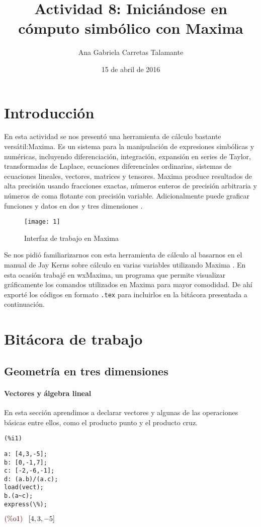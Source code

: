 \documentclass[12pt]{article}
\title{Actividad 8: Iniciándose en cómputo simbólico con Maxima}
\author{Ana Gabriela Carretas Talamante}
\date{15 de abril de 2016}
\begin{document}
\maketitle
\section{Introducción}
En esta actividad se nos presentó una herramienta de cálculo bastante versátil:Maxima. Es un sistema para la manipulación de expresiones simbólicas y numéricas, incluyendo diferenciación, integración, expansión en series de Taylor, transformadas de Laplace, ecuaciones diferenciales ordinarias, sistemas de ecuaciones lineales, vectores, matrices y tensores. Maxima produce resultados de alta precisión usando fracciones exactas, números enteros de precisión arbitraria y números de coma flotante con precisión variable. Adicionalmente puede graficar funciones y datos en dos y tres dimensiones \cite{M}.

\begin{figure}[H]
\centering
\texttt{[image: 1]}
\caption{Interfaz de trabajo en Maxima}
\end{figure}

Se nos pidió familiarizarnos con esta herramienta de cálculo al basarnos en el manual de Jay Kerns sobre cálculo en varias variables utilizando Maxima \cite{JK}. En esta ocasión trabajé en wxMaxima, un programa que permite visualizar gráficamente los comandos utilizados en Maxima para mayor comodidad. De ahí exporté los códigos en formato \texttt{.tex} para incluirlos en la bitácora presentada a continuación.

\section{Bitácora de trabajo}
\subsection{Geometría en tres dimensiones}
\paragraph{Vectores y álgebra lineal} En esta sección aprendimos a declarar vectores y algunas de las operaciones básicas entre ellos, como el producto punto y el producto cruz.

\noindent
\begin{minipage}[t]{8ex}{\color{red}\bf
\begin{verbatim}
(%i1) 
\end{verbatim}}
\end{minipage}
\begin{minipage}[t]{\textwidth}{\color{blue}
\begin{verbatim}
a: [4,3,-5];
b: [0,-1,7];
c: [-2,-6,-1];
d: (a.b)/(a.c);
load(vect);
b.(a~c);
express(\%);
\end{verbatim}}
\end{minipage}
\begin{math}\displaystyle
\parbox{8ex}{\color{labelcolor}(\%o1) }
[4,3,-5]
\end{math}
\end{document}
